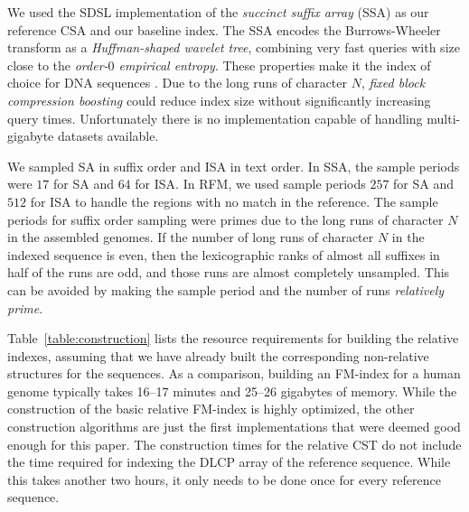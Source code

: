 \documentclass[a4paper,11pt]{llncs}
\newcommand{\CST}{\textsf{CST}}
\newcommand{\SA}{\textsf{SA}}
\newcommand{\ISA}{\textsf{ISA}}
\newcommand{\CSA}{\textsf{CSA}}
\newcommand{\SSA}{\textsf{SSA}}
\newcommand{\RFM}{\textsf{RFM}}
\newcommand{\DLCP}{\textsf{DLCP}}
\begin{document}
We used the SDSL implementation of the \emph{succinct suffix array} (\SSA{}) \cite{Ferragina2007a,Maekinen2005} as our reference \CSA{} and our baseline index. The \SSA{} encodes the Burrows-Wheeler transform as a \emph{Huffman-shaped wavelet tree}, combining very fast queries with size close to the \emph{order\nobreakdash-$0$ empirical entropy}. These properties make it the index of choice for DNA sequences \cite{Ferragina2009a}. Due to the long runs of character $N$, \emph{fixed block compression boosting} \cite{Kaerkkaeinen2011} could reduce index size without significantly increasing query times. Unfortunately there is no implementation capable of handling multi-gigabyte datasets available.

We sampled \SA{} in suffix order and \ISA{} in text order. In \SSA, the sample periods were $17$ for \SA{} and $64$ for \ISA. In \RFM, we used sample periods $257$ for \SA{} and $512$ for \ISA{} to handle the regions with no match in the reference. The sample periods for suffix order sampling were primes due to the long runs of character $N$ in the assembled genomes. If the number of long runs of character $N$ in the indexed sequence is even, then the lexicographic ranks of almost all suffixes in half of the runs are odd, and those runs are almost completely unsampled. This can be avoided by making the sample period and the number of runs \emph{relatively prime}.

Table~\ref{table:construction} lists the resource requirements for building the relative indexes, assuming that we have already built the corresponding non-relative structures for the sequences. As a comparison, building an FM-index for a human genome typically takes 16--17 minutes and 25--26 gigabytes of memory. While the construction of the basic relative FM-index is highly optimized, the other construction algorithms are just the first implementations that were deemed good enough for this paper. The construction times for the relative \CST{} do not include the time required for indexing the \DLCP{} array of the reference sequence. While this takes another two hours, it only needs to be done once for every reference sequence.
\end{document}
